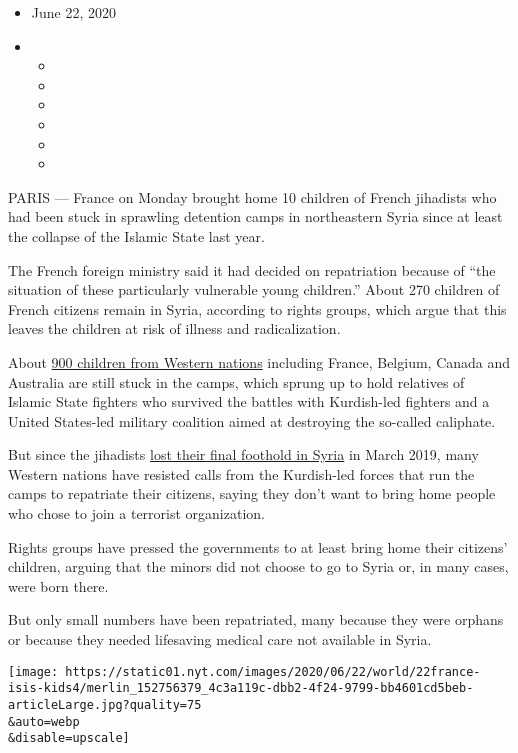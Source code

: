\begin{itemize}
\item
  June 22, 2020
\item
  \begin{itemize}
  \item
  \item
  \item
  \item
  \item
  \item
  \end{itemize}
\end{itemize}

PARIS --- France on Monday brought home 10 children of French jihadists
who had been stuck in sprawling detention camps in northeastern Syria
since at least the collapse of the Islamic State last year.

The French foreign ministry said it had decided on repatriation because
of ``the situation of these particularly vulnerable young children.''
About 270 children of French citizens remain in Syria, according to
rights groups, which argue that this leaves the children at risk of
illness and radicalization.

About
\href{https://www.nytimes.com/2020/05/31/world/middleeast/isis-children-syria-camps.html}{900
children from Western nations} including France, Belgium, Canada and
Australia are still stuck in the camps, which sprung up to hold
relatives of Islamic State fighters who survived the battles with
Kurdish-led fighters and a United States-led military coalition aimed at
destroying the so-called caliphate.

But since the jihadists
\href{https://www.nytimes.com/2019/03/23/world/middleeast/isis-syria-caliphate.html}{lost
their final foothold in Syria} in March 2019, many Western nations have
resisted calls from the Kurdish-led forces that run the camps to
repatriate their citizens, saying they don't want to bring home people
who chose to join a terrorist organization.

Rights groups have pressed the governments to at least bring home their
citizens' children, arguing that the minors did not choose to go to
Syria or, in many cases, were born there.

But only small numbers have been repatriated, many because they were
orphans or because they needed lifesaving medical care not available in
Syria.

\texttt{[image: https://static01.nyt.com/images/2020/06/22/world/22france-isis-kids4/merlin\_152756379\_4c3a119c-dbb2-4f24-9799-bb4601cd5beb-articleLarge.jpg?quality=75\\\&auto=webp\\\&disable=upscale]}

